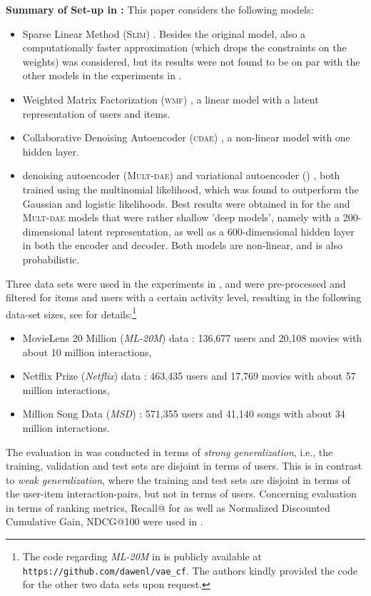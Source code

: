 \documentclass[sigconf]{acmart}
\newcommand{\slim}{{\scshape Slim}}
\newcommand{\wmf}{{\scshape wmf}}
\newcommand{\cdae}{{\scshape cdae}}
\newcommand{\mvae}{}
\newcommand{\mdae}{{\scshape Mult-dae}}
\begin{document}
{\bf Summary of  Set-up in \cite{liang18}:} 
This paper considers the following models:
\begin{itemize}

\item Sparse Linear Method  (\slim{}) \cite{ning11}. Besides the original model, also a   computationally faster approximation  (which drops the constraints on the weights) \cite{levy13} was considered, but its results were not  found  to be on par with the other models in the experiments in \cite{liang18}.

\item Weighted Matrix Factorization (\wmf) \cite{hu08,pan08}, a linear model with a latent representation of users and items.

\item Collaborative Denoising Autoencoder (\cdae) \cite{wu16}, a non-linear model with one hidden layer.

\item denoising autoencoder (\mdae) and variational autoencoder (\mvae) \cite{liang18}, both trained using the multinomial likelihood, which was found to outperform the Gaussian and logistic likelihoods. Best results were obtained in \cite{liang18} for the \mvae{}  and \mdae{} models that were rather shallow 'deep models', namely with a 200-dimensional latent representation, as well as a 600-dimensional hidden layer in both the encoder and decoder. Both models are non-linear, and \mvae{}  is also probabilistic.

\end{itemize}
Three data sets were used in the experiments in \cite{liang18}, and were pre-processed and filtered for items and users with a certain activity level, resulting in the following data-set sizes, see \cite{liang18} for details:\footnote{The code regarding  \emph{ML-20M} in \cite{liang18} is publicly available at {\tt https://github.com/dawenl/vae\_cf}. The authors kindly provided the code for the other two  data sets upon request.}
\begin{itemize}
\item MovieLens 20 Million (\emph{ML-20M}) data \cite{movielens20mio}: 136,677 users and 20,108 movies with about 10 million interactions,
\item Netflix Prize (\emph{Netflix}) data \cite{netflixdata}: 463,435 users and 17,769 movies with about 57 million interactions,
\item Million Song Data (\emph{MSD}) \cite{msddata}: 571,355 users and 41,140 songs with about 34 million interactions.
\end{itemize}
The evaluation in \cite{liang18} was conducted in terms of \emph{strong generalization}, i.e., the training, validation and test sets are disjoint in terms of users. This is in contrast to \emph{weak generalization}, where the training and test sets are disjoint in terms of the user-item interaction-pairs, but not in terms of users. Concerning  evaluation in terms of ranking metrics, Recall@ for  as well as Normalized Discounted Cumulative Gain, NDCG@100 were used  in \cite{liang18}.
\end{document}
